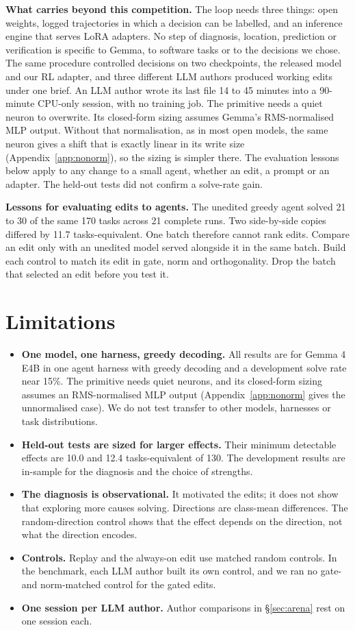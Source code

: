 \textbf{What carries beyond this competition.} The loop needs three things: open weights, logged trajectories in which a decision can be labelled, and an inference engine that serves LoRA adapters. No step of diagnosis, location, prediction or verification is specific to Gemma, to software tasks or to the decisions we chose. The same procedure controlled decisions on two checkpoints, the released model and our RL adapter, and three different LLM authors produced working edits under one brief. An LLM author wrote its last file 14 to 45 minutes into a 90-minute CPU-only session, with no training job. The primitive needs a quiet neuron to overwrite. Its closed-form sizing assumes Gemma's RMS-normalised MLP output. Without that normalisation, as in most open models, the same neuron gives a shift that is exactly linear in its write size (Appendix~\ref{app:nonorm}), so the sizing is simpler there. The evaluation lessons below apply to any change to a small agent, whether an edit, a prompt or an adapter. The held-out tests did not confirm a solve-rate gain.

\textbf{Lessons for evaluating edits to agents.} The unedited greedy agent solved 21 to 30 of the same 170 tasks across 21 complete runs. Two side-by-side copies differed by 11.7 tasks-equivalent. One batch therefore cannot rank edits. Compare an edit only with an unedited model served alongside it in the same batch. Build each control to match its edit in gate, norm and orthogonality. Drop the batch that selected an edit before you test it.

\section{Limitations}
\label{sec:limitations}
\begin{itemize}
    \item \textbf{One model, one harness, greedy decoding.} All results are for Gemma 4 E4B in one agent harness with greedy decoding and a development solve rate near 15\%. The primitive needs quiet neurons, and its closed-form sizing assumes an RMS-normalised MLP output (Appendix~\ref{app:nonorm} gives the unnormalised case). We do not test transfer to other models, harnesses or task distributions.
    \item \textbf{Held-out tests are sized for larger effects.} Their minimum detectable effects are 10.0 and 12.4 tasks-equivalent of 130. The development results are in-sample for the diagnosis and the choice of strengths.
    \item \textbf{The diagnosis is observational.} It motivated the edits; it does not show that exploring more causes solving. Directions are class-mean differences. The random-direction control shows that the effect depends on the direction, not what the direction encodes.
    \item \textbf{Controls.} Replay and the always-on edit use matched random controls. In the benchmark, each LLM author built its own control, and we ran no gate- and norm-matched control for the gated edits.
    \item \textbf{One session per LLM author.} Author comparisons in \S\ref{sec:arena} rest on one session each.
\end{itemize}
